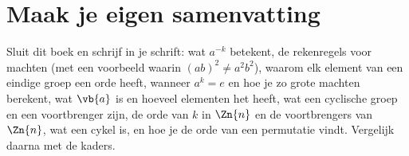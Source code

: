 
\begin{oefeningen}






\end{oefeningen}


\ifzelfstudie
\section*{Maak je eigen samenvatting}
Sluit dit boek en schrijf in je schrift: wat $a^{-k}$ betekent, de rekenregels voor machten (met een voorbeeld waarin $(ab)^2 \neq a^2 b^2$), waarom elk element van een eindige groep een orde heeft, wanneer $a^k = e$ en hoe je zo grote machten berekent, wat $\vb{a}$ is en hoeveel elementen het heeft, wat een cyclische groep en een voortbrenger zijn, de orde van $k$ in $\Zn{n}$ en de voortbrengers van $\Zn{n}$, wat een cykel is, en hoe je de orde van een permutatie vindt. Vergelijk daarna met de kaders.
\fi
